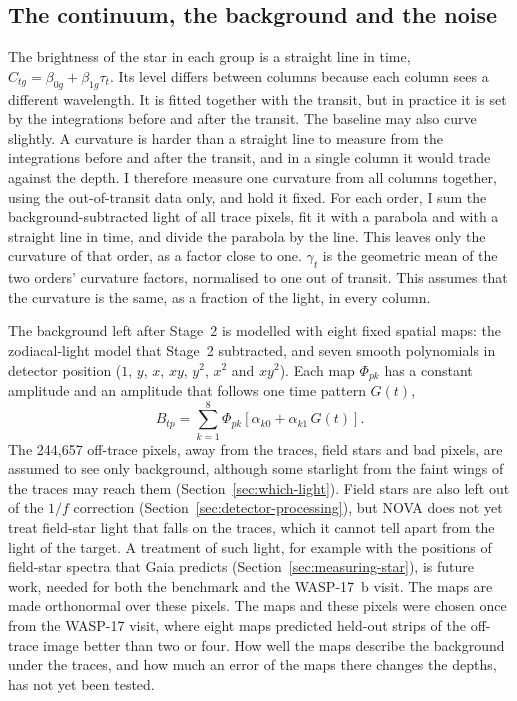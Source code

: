 \subsection{The continuum, the background and the noise}
\label{sec:continuum}

The brightness of the star in each group is a straight line in time,
$C_{tg}=\beta_{0g}+\beta_{1g}\tau_t$. Its level differs between columns
because each column sees a different wavelength. It is fitted together with
the transit, but in practice it is set by the integrations before and after
the transit. The baseline may also curve slightly. A curvature is harder
than a straight line to measure from the integrations before and after the
transit, and in a single column it would trade against the depth. I therefore
measure one curvature from all columns together, using the out-of-transit data
only, and hold it fixed. For each order, I sum the background-subtracted light
of all trace pixels, fit it with a parabola and with a straight line in time,
and divide the parabola by the line. This leaves only the curvature of that
order, as a factor close to one. $\gamma_t$ is the geometric mean of the two
orders' curvature factors, normalised to one out of transit. This assumes that the curvature is the same, as a fraction of
the light, in every column.

The background left after Stage~2 is modelled with eight fixed spatial maps:
the zodiacal-light model that Stage~2 subtracted, and seven smooth polynomials
in detector position ($1$, $y$, $x$, $xy$, $y^2$, $x^2$ and $xy^2$). Each map
$\Phi_{pk}$ has a constant amplitude and an amplitude that follows one time
pattern $G(t)$,
\begin{equation}
 B_{tp}=\sum_{k=1}^{8}\Phi_{pk}
 \left[\alpha_{k0}+\alpha_{k1}\,G(t)\right].
 \label{eq:background-model}
\end{equation}
The 244,657 off-trace pixels, away from the traces, field stars and bad pixels, are assumed to see only background, although some starlight from the faint wings of the traces may reach them (Section~\ref{sec:which-light}). Field stars are also left out of the $1/f$ correction (Section~\ref{sec:detector-processing}), but NOVA does not yet treat field-star light that falls on the traces, which it cannot tell apart from the light of the target. A treatment of such light, for example with the positions of field-star spectra that Gaia predicts (Section~\ref{sec:measuring-star}), is future work, needed for both the benchmark and the WASP-17~b visit. The
maps are made orthonormal over these pixels. The maps and these pixels were
chosen once from the WASP-17 visit, where eight maps predicted held-out strips
of the off-trace image better than two or four. How well the maps
describe the background under the traces, and how much an error of the maps
there changes the depths, has not yet been tested.

